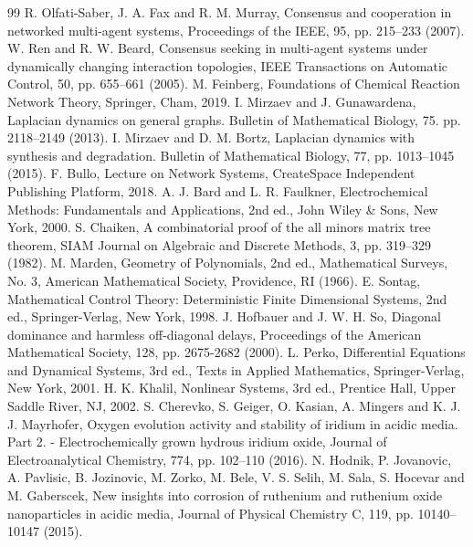 \documentclass[11pt,a4paper]{article}
\begin{document}
\begin{thebibliography}{99}
%
R. Olfati-Saber, J. A. Fax and R. M. Murray, Consensus and cooperation in networked multi-agent systems, Proceedings of the IEEE, 95, pp. 215--233 (2007).
%
W. Ren and R. W. Beard, Consensus seeking in multi-agent systems under dynamically changing interaction topologies, IEEE Transactions on Automatic Control, 50, pp. 655--661 (2005).
%
M. Feinberg, Foundations of Chemical Reaction Network Theory, Springer, Cham, 2019.
%
I. Mirzaev and J. Gunawardena, Laplacian dynamics on general graphs. Bulletin of Mathematical Biology, 75. pp. 2118--2149 (2013).
%
I. Mirzaev and D. M. Bortz, Laplacian dynamics with synthesis and degradation. Bulletin of Mathematical Biology, 77, pp. 1013--1045 (2015).
%
F. Bullo, Lecture on Network Systems, CreateSpace Independent Publishing Platform, 2018.
%
A. J. Bard and L. R. Faulkner, Electrochemical Methods: Fundamentals and Applications, 2nd ed., John Wiley \& Sons, New York, 2000.
%
S. Chaiken, A combinatorial proof of the all minors matrix tree theorem, SIAM Journal on Algebraic and Discrete Methods, 3, pp. 319--329 (1982).
M. Marden, Geometry of Polynomials, 2nd ed., Mathematical Surveys, No. 3, American Mathematical Society, Providence, RI (1966).
%
E. Sontag, Mathematical Control Theory: Deterministic Finite Dimensional Systems, 2nd ed., Springer-Verlag, New York, 1998.
%
 J. Hofbauer and J. W. H. So, Diagonal dominance and harmless off-diagonal delays, Proceedings of the American Mathematical Society, 128,  pp. 2675-2682 (2000).
%
L. Perko, Differential Equations and Dynamical Systems, 3rd ed., Texts in Applied Mathematics, Springer-Verlag, New York, 2001.
%
H. K. Khalil, Nonlinear Systems, 3rd ed., Prentice Hall, Upper Saddle River, NJ, 2002.
%
S. Cherevko, S. Geiger, O. Kasian, A. Mingers and K. J. J. Mayrhofer, Oxygen evolution activity and stability of iridium in acidic media. Part 2. - Electrochemically grown hydrous iridium oxide, Journal of Electroanalytical Chemistry, 774, pp. 102--110 (2016).
%
N. Hodnik, P. Jovanovic, A. Pavlisic, B. Jozinovic, M. Zorko, M. Bele, V. S. Selih, M. Sala, S. Hocevar and M. Gaberscek, New insights into corrosion of ruthenium and ruthenium oxide nanoparticles in acidic media, Journal of Physical Chemistry C, 119, pp. 10140--10147 (2015).

\end{thebibliography}
\end{document}
